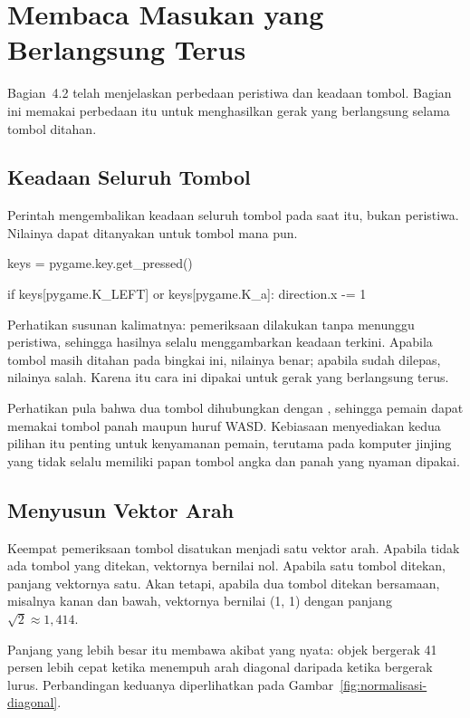 \section{Membaca Masukan yang Berlangsung Terus}
\label{sec:masukan-berlangsung}

Bagian~4.2 telah menjelaskan perbedaan peristiwa dan keadaan tombol. Bagian
ini memakai perbedaan itu untuk menghasilkan gerak yang berlangsung selama
tombol ditahan.

\subsection{Keadaan Seluruh Tombol}

Perintah  mengembalikan keadaan seluruh tombol
pada saat itu, bukan peristiwa. Nilainya dapat ditanyakan untuk tombol mana
pun.

\begin{kodekeluaran}
keys = pygame.key.get_pressed()

if keys[pygame.K_LEFT] or keys[pygame.K_a]:
    direction.x -= 1
\end{kodekeluaran}

Perhatikan susunan kalimatnya: pemeriksaan dilakukan tanpa menunggu peristiwa,
sehingga hasilnya selalu menggambarkan keadaan terkini. Apabila tombol masih
ditahan pada bingkai ini, nilainya benar; apabila sudah dilepas, nilainya
salah. Karena itu cara ini dipakai untuk gerak yang berlangsung terus.

Perhatikan pula bahwa dua tombol dihubungkan dengan , sehingga pemain
dapat memakai tombol panah maupun huruf WASD. Kebiasaan menyediakan kedua
pilihan itu penting untuk kenyamanan pemain, terutama pada komputer jinjing
yang tidak selalu memiliki papan tombol angka dan panah yang nyaman dipakai.

\subsection{Menyusun Vektor Arah}

Keempat pemeriksaan tombol disatukan menjadi satu vektor arah. Apabila tidak
ada tombol yang ditekan, vektornya bernilai nol. Apabila satu tombol ditekan,
panjang vektornya satu. Akan tetapi, apabila dua tombol ditekan bersamaan,
misalnya kanan dan bawah, vektornya bernilai (1, 1) dengan panjang
$\sqrt{2} \approx 1{,}414$.

Panjang yang lebih besar itu membawa akibat yang nyata: objek bergerak 41
persen lebih cepat ketika menempuh arah diagonal daripada ketika bergerak
lurus. Perbandingan keduanya diperlihatkan pada
Gambar~\ref{fig:normalisasi-diagonal}.


